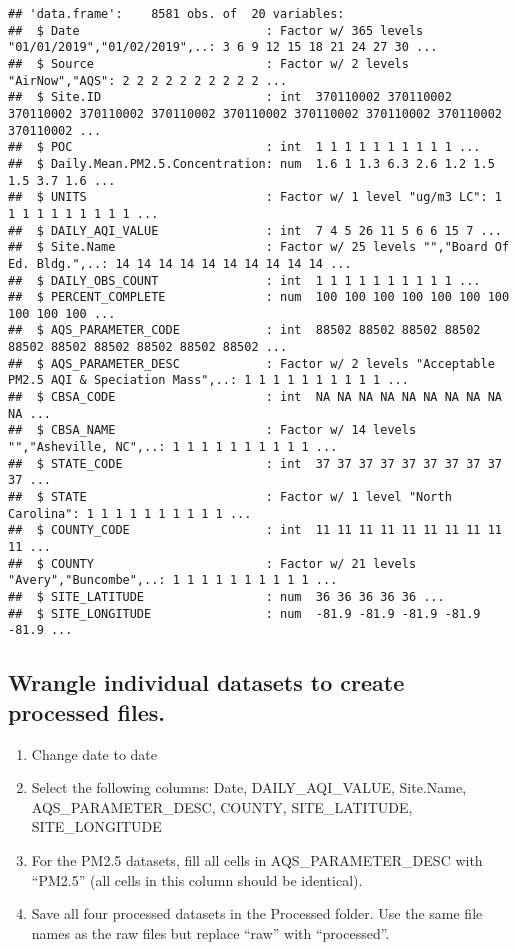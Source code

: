 \documentclass[]{article}
\providecommand{\tightlist}{%
  \setlength{\itemsep}{0pt}\setlength{\parskip}{0pt}}
\begin{document}
\begin{verbatim}
## 'data.frame':    8581 obs. of  20 variables:
##  $ Date                          : Factor w/ 365 levels "01/01/2019","01/02/2019",..: 3 6 9 12 15 18 21 24 27 30 ...
##  $ Source                        : Factor w/ 2 levels "AirNow","AQS": 2 2 2 2 2 2 2 2 2 2 ...
##  $ Site.ID                       : int  370110002 370110002 370110002 370110002 370110002 370110002 370110002 370110002 370110002 370110002 ...
##  $ POC                           : int  1 1 1 1 1 1 1 1 1 1 ...
##  $ Daily.Mean.PM2.5.Concentration: num  1.6 1 1.3 6.3 2.6 1.2 1.5 1.5 3.7 1.6 ...
##  $ UNITS                         : Factor w/ 1 level "ug/m3 LC": 1 1 1 1 1 1 1 1 1 1 ...
##  $ DAILY_AQI_VALUE               : int  7 4 5 26 11 5 6 6 15 7 ...
##  $ Site.Name                     : Factor w/ 25 levels "","Board Of Ed. Bldg.",..: 14 14 14 14 14 14 14 14 14 14 ...
##  $ DAILY_OBS_COUNT               : int  1 1 1 1 1 1 1 1 1 1 ...
##  $ PERCENT_COMPLETE              : num  100 100 100 100 100 100 100 100 100 100 ...
##  $ AQS_PARAMETER_CODE            : int  88502 88502 88502 88502 88502 88502 88502 88502 88502 88502 ...
##  $ AQS_PARAMETER_DESC            : Factor w/ 2 levels "Acceptable PM2.5 AQI & Speciation Mass",..: 1 1 1 1 1 1 1 1 1 1 ...
##  $ CBSA_CODE                     : int  NA NA NA NA NA NA NA NA NA NA ...
##  $ CBSA_NAME                     : Factor w/ 14 levels "","Asheville, NC",..: 1 1 1 1 1 1 1 1 1 1 ...
##  $ STATE_CODE                    : int  37 37 37 37 37 37 37 37 37 37 ...
##  $ STATE                         : Factor w/ 1 level "North Carolina": 1 1 1 1 1 1 1 1 1 1 ...
##  $ COUNTY_CODE                   : int  11 11 11 11 11 11 11 11 11 11 ...
##  $ COUNTY                        : Factor w/ 21 levels "Avery","Buncombe",..: 1 1 1 1 1 1 1 1 1 1 ...
##  $ SITE_LATITUDE                 : num  36 36 36 36 36 ...
##  $ SITE_LONGITUDE                : num  -81.9 -81.9 -81.9 -81.9 -81.9 ...
\end{verbatim}

\hypertarget{wrangle-individual-datasets-to-create-processed-files.}{%
\subsection{Wrangle individual datasets to create processed
files.}\label{wrangle-individual-datasets-to-create-processed-files.}}

\begin{enumerate}
\def\labelenumi{\arabic{enumi}.}
\setcounter{enumi}{2}
\tightlist
\item
  Change date to date
\item
  Select the following columns: Date, DAILY\_AQI\_VALUE, Site.Name,
  AQS\_PARAMETER\_DESC, COUNTY, SITE\_LATITUDE, SITE\_LONGITUDE
\item
  For the PM2.5 datasets, fill all cells in AQS\_PARAMETER\_DESC with
  ``PM2.5'' (all cells in this column should be identical).
\item
  Save all four processed datasets in the Processed folder. Use the same
  file names as the raw files but replace ``raw'' with ``processed''.
\end{enumerate}
\end{document}
